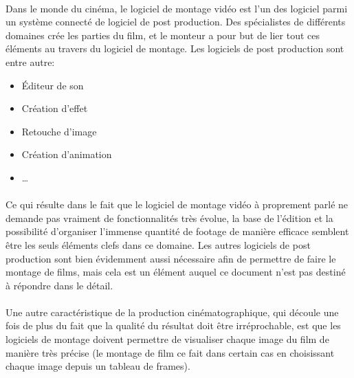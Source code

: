       \paragraph{}
        Dans le monde du cinéma, le logiciel de montage vidéo est l'un des logiciel
        parmi un système connecté de logiciel de post production. Des spécialistes de
        différents domaines crée les parties du film, et le monteur a pour but
        de lier tout ces éléments au travers du logiciel de montage. Les logiciels
        de post production sont entre autre:
        \begin{itemize}
          \item{Éditeur de son}
          \item{Création d'effet}
          \item{Retouche d'image}
          \item{Création d'animation}
          \item{\ldots}
        \end{itemize}

      \paragraph{}
        Ce qui résulte dans le fait que le logiciel de montage vidéo à proprement parlé ne
        demande pas vraiment de fonctionnalités très évolue, la base de l'édition
        et la possibilité d'organiser l'immense quantité de footage de manière efficace
        semblent être les seuls éléments clefs dans ce domaine. Les autres logiciels de
        post production sont bien évidemment aussi nécessaire afin de permettre de faire
        le montage de films, mais cela est un élément auquel ce document n'est pas destiné
        à répondre dans le détail.

      \paragraph{}
        Une autre caractéristique de la production cinématographique, qui découle une
        fois de plus du fait que la qualité du résultat doit être irréprochable, est
        que les logiciels de montage doivent permettre de visualiser chaque image du
        film de manière très précise (le montage de film ce fait dans certain cas en
        choisissant chaque image depuis un tableau de frames).


